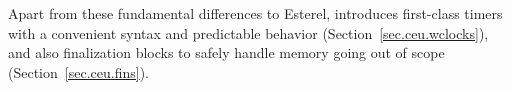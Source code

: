 Apart from these fundamental differences to Esterel, \CEU introduces 
first-class timers with a convenient syntax and predictable behavior 
(Section~\ref{sec.ceu.wclocks}), and also finalization blocks to safely handle 
memory going out of scope (Section~\ref{sec.ceu.fins}).

